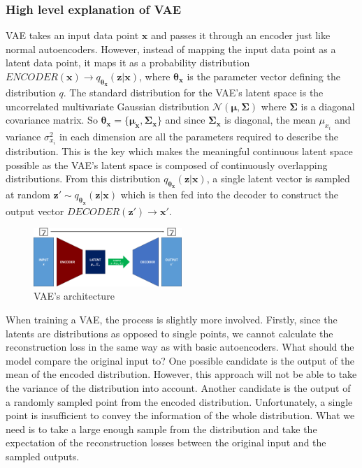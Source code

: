             \subsubsection{High level explanation of VAE}
                VAE takes an input data point $\bm{x}$ and passes it through an encoder just like normal autoencoders. However, instead of mapping the input data point as a latent data point, it maps it as a probability distribution $ENCODER(\bm{x}) \rightarrow q_{\bm{\theta_x}}(\bm{z}|\bm{x})$, where $\bm{\theta_x}$ is the parameter vector defining the distribution $q$. The standard distribution for the VAE's latent space is the uncorrelated multivariate Gaussian distribution $\mathcal{N}(\bm{\mu}, \bm{\Sigma})$ where $\bm{\Sigma}$ is a diagonal covariance matrix. So $\bm{\theta_x} = \{\bm{\mu_x}, \bm{\Sigma_x}\}$ and since $\bm{\Sigma_x}$ is diagonal, the mean $\mu_{x_i}$ and variance $\sigma_{x_i}^2$ in each dimension are all the parameters required to describe the distribution. This is the key which makes the meaningful continuous latent space possible as the VAE's latent space is composed of continuously overlapping distributions. From this distribution $q_{\bm{\theta_x}}(\bm{z}|\bm{x})$, a single latent vector is sampled at random $\bm{z'} \sim q_{\bm{\theta_x}}(\bm{z}|\bm{x})$ which is then fed into the decoder to construct the output vector $DECODER(\bm{z'}) \rightarrow \bm{x'}$.
                
                \begin{figure}[H] \label{fig:vae_arch}
                    \centering
                    \includegraphics[width=0.5\textwidth]{imgs/vae_arch.png}
                    \caption{VAE's architecture}
                \end{figure}

                When training a VAE, the process is slightly more involved. Firstly, since the latents are distributions as opposed to single points, we cannot calculate the reconstruction loss in the same way as with basic autoencoders. What should the model compare the original input to? One possible candidate is the output of the mean of the encoded distribution. However, this approach will not be able to take the variance of the distribution into account. Another candidate is the output of a randomly sampled point from the encoded distribution. Unfortunately, a single point is insufficient to convey the information of the whole distribution. What we need is to take a large enough sample from the distribution and take the expectation of the reconstruction losses between the original input and the sampled outputs.
                
